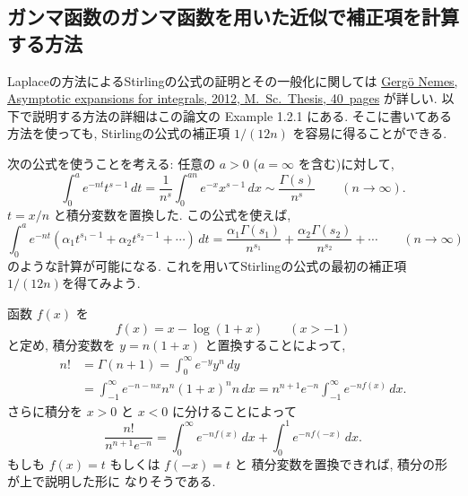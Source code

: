 \documentclass[12pt,twoside]{jarticle}
\theoremstyle{jplain}
\theoremstyle{jplain}
\theoremstyle{jplain}
\numberwithin{theorem}{section}
\numberwithin{equation}{section}
\numberwithin{figure}{section}
\numberwithin{table}{section}
\begin{document}
\subsection{ガンマ函数のガンマ函数を用いた近似で補正項を計算する方法}

Laplaceの方法によるStirlingの公式の証明とその一般化に関しては
\href{https://www.cs.elte.hu/blobs/diplomamunkak/msc_mat/2012/nemes_gergo.pdf}
{Gerg\"o Nemes, Asymptotic expansions for integrals, 2012, M.~Sc.~Thesis, 40~pages}
が詳しい. 以下で説明する方法の詳細はこの論文の Example 1.2.1 にある.
そこに書いてある方法を使っても,
Stirlingの公式の補正項 $1/(12n)$ を容易に得ることができる.

次の公式を使うことを考える: 任意の $a>0$ ($a=\infty$ を含む)に対して,
\[
\int_0^a e^{-nt} t^{s-1}\,dt
= \frac{1}{n^s}\int_0^{an} e^{-x} x^{s-1}\,dx
\sim
\frac{\Gamma(s)}{n^s}
\qquad (n\to\infty).
\]
$t=x/n$ と積分変数を置換した. この公式を使えば,
\[
\int_0^a e^{-nt} (\alpha_1 t^{s_1-1} + \alpha_2 t^{s_2-1} + \cdots)\,dt
=
\frac{\alpha_1\Gamma(s_1)}{n^{s_1}} + \frac{\alpha_2\Gamma(s_2)}{n^{s_2}} + \cdots
\qquad (n\to\infty)
\]
のような計算が可能になる.
これを用いてStirlingの公式の最初の補正項 $1/(12n)$を得てみよう.

函数 $f(x)$ を
\[
f(x) = x-\log(1+x) \qquad (x>-1)
\]
と定め, 積分変数を $y=n(1+x)$ と置換することによって,
\begin{align*}
n!
&= \Gamma(n+1)
= \int_0^\infty e^{-y} y^n\,dy
\\ &
= \int_{-1}^\infty e^{-n-nx}n^n(1+x)^n n\,dx
= n^{n+1}e^{-n}\int_{-1}^\infty e^{-nf(x)}\,dx.
\end{align*}
さらに積分を $x>0$ と $x<0$ に分けることによって
\[
\frac{n!}{n^{n+1}e^{-n}}
= \int_0^\infty e^{-nf(x)}\,dx + \int_0^1 e^{-nf(-x)}\,dx.
\]
もしも $f(x)=t$ もしくは $f(-x)=t$ と
積分変数を置換できれば, 積分の形が上で説明した形に
なりそうである.
\end{document}
